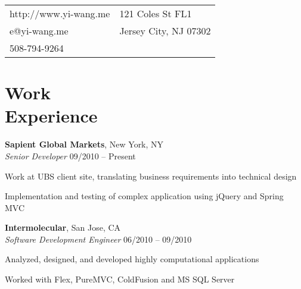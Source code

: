 \documentclass[margin,line]{resume}
\begin{document}
\begin{resume}

      \begin{tabular}{@{}p{6cm}p{8.5cm}}
      http://www.yi-wang.me  &  121 Coles St FL1 \\
      e@yi-wang.me             &  Jersey City, NJ 07302 \\
      508-794-9264	&  \\
      \end{tabular}



    \section{\mysidestyle Work \\ Experience}

    \textbf{Sapient Global Markets}, New York, NY \\
    \textsl{Senior Developer} \hfill 09/2010 -- Present  \vspace{-3mm}\\\vspace{-1mm}%
      \begin{list2}
      \item Work at UBS client site, translating business requirements into technical design
      \item Implementation and testing of complex application using jQuery and Spring MVC
      \end{list2}

    \textbf{Intermolecular}, San Jose, CA \\
    \textsl{Software Development Engineer} \hfill 06/2010 -- 09/2010 \vspace{-3mm}\\\vspace{-1mm}%
      \begin{list2}
      \item Analyzed, designed, and developed highly computational applications
      \item Worked with Flex, PureMVC, ColdFusion and MS SQL Server
      \end{list2}


\end{resume}
\end{document}
